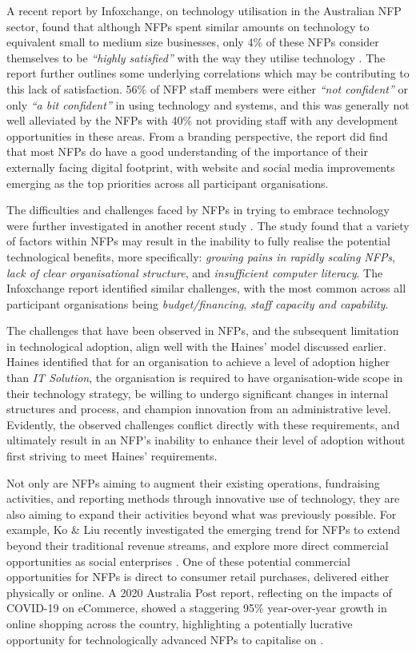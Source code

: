 A recent report by Infoxchange, on technology utilisation in the Australian NFP sector, found that although NFPs spent similar amounts on technology to equivalent small to medium size businesses, only 4\% of these NFPs consider themselves to be \emph{“highly satisfied”} with the way they utilise technology \cite{infoxchange_2019}. The report further outlines some underlying correlations which may be contributing to this lack of satisfaction. 56\% of NFP staff members were either \emph{“not confident”} or only \emph{“a bit confident”} in using technology and systems, and this was generally not well alleviated by the NFPs with 40\% not providing staff with any development opportunities in these areas. From a branding perspective, the report did find that most NFPs do have a good understanding of the importance of their externally facing digital footprint, with website and social media improvements emerging as the top priorities across all participant organisations.

The difficulties and challenges faced by NFPs in trying to embrace technology were further investigated in another recent study \cite{le2008view}. The study found that a variety of factors within NFPs may result in the inability to fully realise the potential technological benefits, more specifically: \emph{growing pains in rapidly scaling NFPs}, \emph{lack of clear organisational structure}, and \emph{insufficient computer literacy}. The Infoxchange report identified similar challenges, with the most common across all participant organisations being \emph{budget/financing}, \emph{staff capacity and capability}.

The challenges that have been observed in NFPs, and the subsequent limitation in technological adoption, align well with the Haines' model discussed earlier. Haines identified that for an organisation to achieve a level of adoption higher than \emph{IT Solution}, the organisation is required to have organisation-wide scope in their technology strategy, be willing to undergo significant changes in internal structures and process, and champion innovation from an administrative level. Evidently, the observed challenges conflict directly with these requirements, and ultimately result in an NFP's inability to enhance their level of adoption without first striving to meet Haines' requirements.

Not only are NFPs aiming to augment their existing operations, fundraising activities, and reporting methods through innovative use of technology, they are also aiming to expand their activities beyond what was previously possible. For example, Ko \& Liu recently investigated the emerging trend for NFPs to extend beyond their traditional revenue streams, and explore more direct commercial opportunities as social enterprises \cite{ko2020transformation}. One of these potential commercial opportunities for NFPs is direct to consumer retail purchases, delivered either physically or online. A 2020 Australia Post report, reflecting on the impacts of COVID-19 on eCommerce, showed a staggering 95\% year-over-year growth in online shopping across the country, highlighting a potentially lucrative opportunity for technologically advanced NFPs to capitalise on \cite{auspost2020}.

